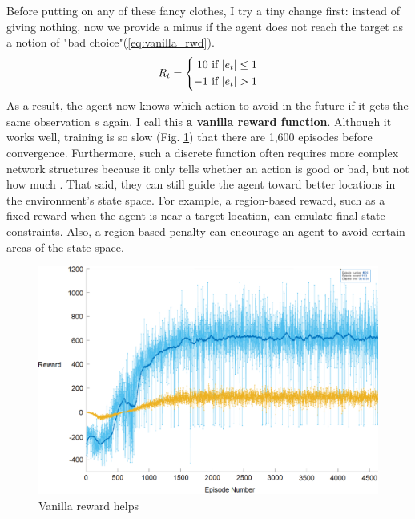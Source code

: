 \documentclass[../main.tex]{subfiles}
\begin{document}
Before putting on any of these fancy clothes, I try a tiny change first: instead of giving nothing, now we provide a minus if the agent does not reach the target as a notion of "bad choice"(\ref{eq:vanilla_rwd}). 
\begin{equation} \label{eq:vanilla_rwd}
    R_t = \left\{ \begin{aligned}
        10 & \text{ if $\abs{e_t} \le 1$} \\
        -1 & \text{ if $\abs{e_t} > 1$}
    \end{aligned}\right.
\end{equation}
As a result, the agent now knows which action to avoid in the future if it gets the same observation $s$ again. I call this \textbf{a vanilla reward function}. Although it works well, training is so slow (Fig. \ref{fig:vanilla_rwd}) that there are 1,600 episodes before convergence. Furthermore, such a discrete function often requires more complex network structures because it only tells whether an action is good or bad, but not how much \cite{MathWorksReward2021, rlbible_rewarddesign}. That said, they can still guide the agent toward better locations in the environment's state space. For example, a region-based reward, such as a fixed reward when the agent is near a target location, can emulate final-state constraints. Also, a region-based penalty can encourage an agent to avoid certain areas of the state space.
\begin{figure}[htbp]
    \centering
    \includegraphics[width=1\linewidth]{figures/vanilla_rwd.png}
    \caption{Vanilla reward helps}
    \label{fig:vanilla_rwd}
\end{figure}
\end{document}
